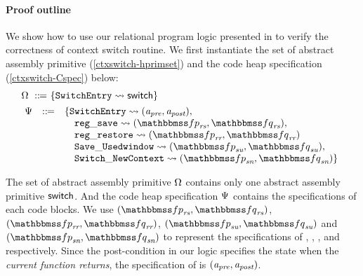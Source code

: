 {\color{blue}
\paragraph{\textbf{Proof outline}} We show how to use 
our relational program logic presented in 
\Fig{\ref{fig:Selected Inference Rules for Refinement Verification}} 
to verify the correctness of context switch routine. 
We first instantiate the set of 
abstract assembly primitive (\ref{ctxswitch-hprimset})
and the code heap specification (\ref{ctxswitch-Cspec})
below:
\begin{align}
    & \hprimset \ \define \ \{ \SwitchEntry \leadsto 
        \primsw \} 
        \label{ctxswitch-hprimset} \\
    & \!\begin{array}{lcl}
        \Cspec & \define & 
        \{ \SwitchEntry \leadsto (\Apre, \Apost), \\
        & & \quad
        \regsave \leadsto 
        (\relspecpre_{\textit{rs}}, \relspecpost_{\textit{rs}}),\\
        & & \quad
        \regrestore \leadsto
        (\relspecpre_{\textit{rr}}, \relspecpost_{\textit{rr}}) \\
        & & \quad
        \SaveUsedWin{} \leadsto (\relspecpre_{\textit{su}}, \relspecpost_{\textit{su}}), \\
        & & \quad
        \SwitchNewTask{} \leadsto (\relspecpre_{\textit{sn}}, \relspecpost_{\textit{sn}})
        \}
        \label{ctxswitch-Cspec}
    \end{array}
\end{align}

The set of abstract assembly primitive $\Omega$ 
contains only one abstract assembly primitive $\mathsf{switch}$. 
And the code heap specification $\Psi{}$
contains the specifications of each code blocks. 
We use 
$(\relspecpre_{\textit{rs}}, \relspecpost_{\textit{rs}})$, 
$(\relspecpre_{\textit{rr}}, \relspecpost_{\textit{rr}})$, 
$(\relspecpre_{\textit{su}}, \relspecpost_{\textit{su}})$ and
$(\relspecpre_{\textit{sn}}, \relspecpost_{\textit{sn}})$
to represent the specifications of 
\SwitchEntry{}, \regsave{}, \regrestore{}, 
\SaveUsedWin{} and \SwitchNewTask{} respectively. 
Since the post-condition in our logic specifies the 
state when the \textit{current function returns}, 
the specification of \SwitchEntry{} is $(\textit{a}_\textit{pre}, \textit{a}_\textit{post})$.

}
